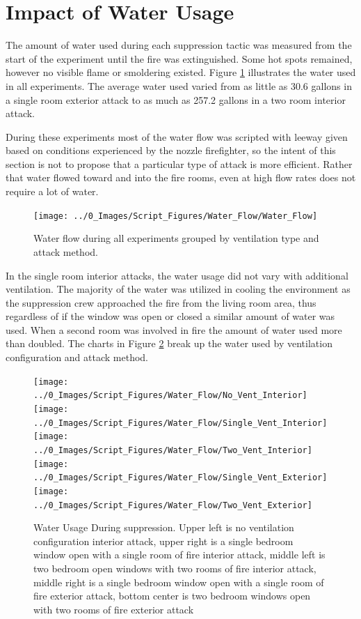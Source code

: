 \documentclass[12pt,oneside]{book}
\begin{document}
\section{Impact of Water Usage}
The amount of water used during each suppression tactic was measured from the start of the experiment until the fire was extinguished. Some hot spots remained, however no visible flame or smoldering existed. Figure \ref{fig:water_flow_all} illustrates the water used in all experiments. The average water used varied from as little as 30.6 gallons in a single room exterior attack to as much as 257.2 gallons in a two room interior attack.

During these experiments most of the water flow was scripted with leeway given based on conditions experienced by the nozzle firefighter, so the intent of this section is not to propose that a particular type of attack is more efficient.  Rather that water flowed toward and into the fire rooms, even at high flow rates does not require a lot of water.

\begin{figure}[H]
\centering
\texttt{[image: ../0\_Images/Script\_Figures/Water\_Flow/Water\_Flow]}
\caption[Water Flow All Experiments]{Water flow during all experiments grouped by ventilation type and attack method.}
\label{fig:water_flow_all}
\end{figure}

In the single room interior attacks, the water usage did not vary with additional ventilation. The majority of the water was utilized in cooling the environment as the suppression crew approached the fire from the living room area, thus regardless of if the window was open or closed a similar amount of water was used. When a second room was involved in fire the amount of water used more than doubled. The charts in Figure \ref{fig:water_flow_vent_compare} break up the water used by ventilation configuration and attack method.  

\begin{figure}[H]
\centering
\texttt{[image: ../0\_Images/Script\_Figures/Water\_Flow/No\_Vent\_Interior]}
\texttt{[image: ../0\_Images/Script\_Figures/Water\_Flow/Single\_Vent\_Interior]}
\texttt{[image: ../0\_Images/Script\_Figures/Water\_Flow/Two\_Vent\_Interior]}
\texttt{[image: ../0\_Images/Script\_Figures/Water\_Flow/Single\_Vent\_Exterior]}
\texttt{[image: ../0\_Images/Script\_Figures/Water\_Flow/Two\_Vent\_Exterior]}
\caption[Water Usage vs. Ventilation]{Water Usage During suppression. Upper left is no ventilation configuration interior attack, upper right is a single bedroom window open with a single room of fire interior attack, middle left is two bedroom open windows with two rooms of fire interior attack, middle right is a single bedroom window open with a single room of fire exterior attack, bottom center is two bedroom windows open with two rooms of fire exterior attack}
\label{fig:water_flow_vent_compare}
\end{figure}
\end{document}
